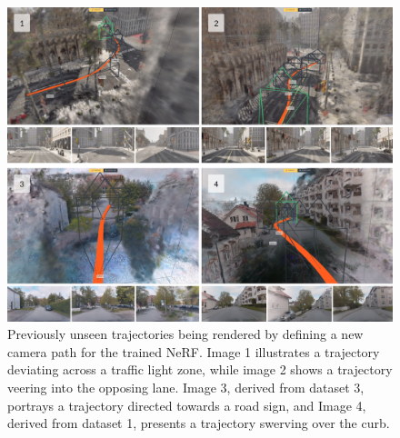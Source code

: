 \begin{figure}[h]
    \centering
    \includegraphics[width=1.0\textwidth]{figures/altered-trajectories.png}
    \caption[Results from experiment 6: Altered trajectories]{Previously unseen trajectories being rendered by defining a new camera path for the trained NeRF. Image 1 illustrates a trajectory deviating across a traffic light zone, while image 2 shows a trajectory veering into the opposing lane. Image 3, derived from dataset 3, portrays a trajectory directed towards a road sign, and Image 4, derived from dataset 1, presents a trajectory swerving over the curb.}
    \label{fig:altered-trajectories}
\end{figure}